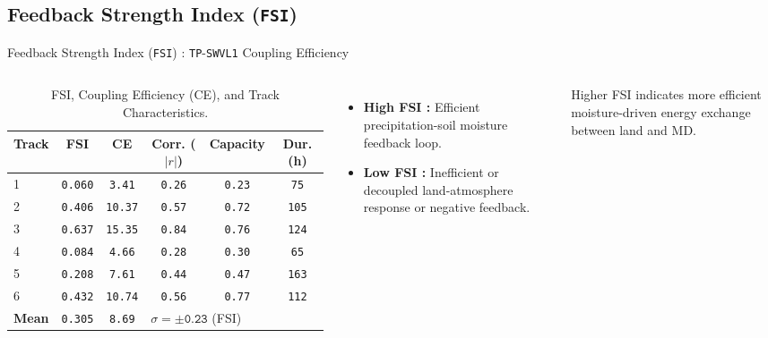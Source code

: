 \documentclass[8pt, aspectratio=169]{beamer}
\begin{document}
\subsection{Feedback Strength Index (\texttt{FSI})}
\begin{frame}{Feedback Strength Index (\texttt{FSI}) : \texttt{TP}-\texttt{SWVL1} Coupling Efficiency}
    \begin{center}
        \begin{columns}[T]
            \footnotesize
            \begin{table}[h]
                \caption{FSI, Coupling Efficiency (CE), and Track Characteristics.}
                \begin{tabular}{lccccc}
                    \toprule
                    \textbf{Track} & \textbf{FSI} & \textbf{CE} & \textbf{Corr. ($|r|$)} & \textbf{Capacity} & \textbf{Dur. (h)} \\
                    \midrule
                    1              & \texttt{0.060} & \texttt{3.41}  & \texttt{0.26} & \texttt{0.23} & \texttt{75}  \\
                    2              & \texttt{0.406} & \texttt{10.37} & \texttt{0.57} & \texttt{0.72} & \texttt{105} \\
                    3              & \texttt{0.637} & \texttt{15.35} & \texttt{0.84} & \texttt{0.76} & \texttt{124} \\
                    4              & \texttt{0.084} & \texttt{4.66}  & \texttt{0.28} & \texttt{0.30} & \texttt{65}  \\
                    5              & \texttt{0.208} & \texttt{7.61}  & \texttt{0.44} & \texttt{0.47} & \texttt{163} \\
                    6              & \texttt{0.432} & \texttt{10.74} & \texttt{0.56} & \texttt{0.77} & \texttt{112} \\
                    \midrule
                    \textbf{Mean}  & \texttt{0.305} & \texttt{8.69}  & \multicolumn{3}{l}{$\sigma = \pm \texttt{0.23}$ (FSI)} \\
                    \bottomrule
                \end{tabular}
            \end{table}

            \vspace{0.5cm}
            \footnotesize
            \begin{itemize}
                \item \textbf{High FSI :} Efficient precipitation-soil moisture feedback loop.
                \item \textbf{Low FSI :} Inefficient or decoupled land-atmosphere response or negative feedback.
            \end{itemize}
            \vspace{0.4cm}
            Higher FSI indicates more efficient moisture-driven energy exchange between land and MD.
        \end{columns}


\end{center}
\end{frame}
\end{document}
